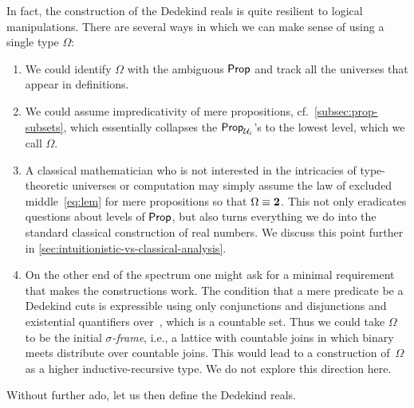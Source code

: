 In fact, the construction of the Dedekind reals is quite resilient to logical
manipulations. There are several ways in which we can make sense of using a single type
$\Omega$:
%
\begin{enumerate}

\item We could identify $\Omega$ with the ambiguous $\mathsf{Prop}$ and track all the universes
  that appear in definitions.

\item We could assume impredicativity of mere propositions, cf.\
  \ref{subsec:prop-subsets}, which essentially collapses the $\mathsf{Prop}_{\mathcal{U}_i}$'s to the
  lowest level, which we call $\Omega$.

\item A classical mathematician who is not interested in the intricacies of type-theoretic
  universes or computation may simply assume the law of excluded middle~\eqref{eq:lem} for
  mere propositions so that $\Omega \equiv \mathbf{2}$. This not only eradicates questions about
  levels of $\mathsf{Prop}$, but also turns everything we do into the standard classical
  construction of real numbers. We discuss this point further in
  \autoref{sec:intuitionistic-vs-classical-analysis}.

\item On the other end of the spectrum one might ask for a minimal requirement that makes
  the constructions work. The condition that a mere predicate be a Dedekind cuts is
  expressible using only conjunctions and disjunctions and existential quantifiers
  over~\Q, which is a countable set. Thus we could take $\Omega$ to be the initial
  \emph{$\sigma$-frame}, i.e., a lattice with countable joins in which binary meets
  distribute over countable joins. This would lead to a construction of~$\Omega$ as a
  higher inductive-recursive type. We do not explore this direction here.
\end{enumerate}

Without further ado, let us then define the Dedekind reals.


